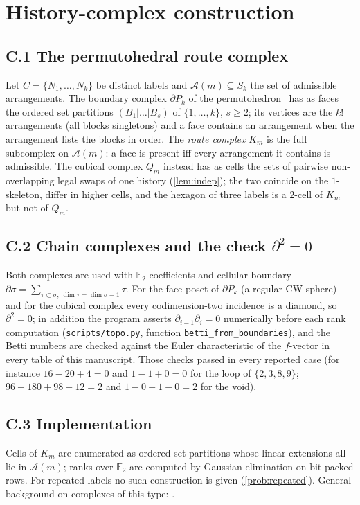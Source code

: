 \section{History-complex construction}\label{app:complex}
\subsection*{C.1 The permutohedral route complex}
Let $C=\{N_1,\dots,N_k\}$ be distinct labels and $\mathcal A(m)\subseteq S_k$ the set of admissible arrangements. The boundary complex $\partial P_k$ of the permutohedron~\cite{Ziegler1995} has as faces the ordered set partitions $(B_1|\dots|B_s)$ of $\{1,\dots,k\}$, $s\ge2$; its vertices are the $k!$ arrangements (all blocks singletons) and a face contains an arrangement when the arrangement lists the blocks in order. The \emph{route complex} $K_m$ is the full subcomplex on $\mathcal A(m)$: a face is present iff every arrangement it contains is admissible. The cubical complex $Q_m$ instead has as cells the sets of pairwise non-overlapping legal swaps of one history (\cref{lem:indep}); the two coincide on the $1$-skeleton, differ in higher cells, and the hexagon of three labels is a $2$-cell of $K_m$ but not of $Q_m$.
\subsection*{C.2 Chain complexes and the check $\partial^2=0$}
Both complexes are used with $\mathbb F_2$ coefficients and cellular boundary $\partial\sigma=\sum_{\tau\subset\sigma,\ \dim\tau=\dim\sigma-1}\tau$. For the face poset of $\partial P_k$ (a regular CW sphere) and for the cubical complex every codimension-two incidence is a diamond, so $\partial^2=0$; in addition the program asserts $\partial_{i-1}\partial_i=0$ numerically before each rank computation (\texttt{scripts/topo.py}, function \texttt{betti\_from\_boundaries}), and the Betti numbers are checked against the Euler characteristic of the $f$-vector in every table of this manuscript. Those checks passed in every reported case (for instance $16-20+4=0$ and $1-1+0=0$ for the loop of $\{2,3,8,9\}$; $96-180+98-12=2$ and $1-0+1-0=2$ for the void).
\subsection*{C.3 Implementation}
Cells of $K_m$ are enumerated as ordered set partitions whose linear extensions all lie in $\mathcal A(m)$; ranks over $\mathbb F_2$ are computed by Gaussian elimination on bit-packed rows. For repeated labels no such construction is given (\cref{prob:repeated}). General background on complexes of this type: \cite{Bjorner1995,Kozlov2008}.

